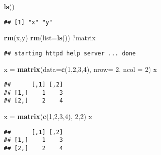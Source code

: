 \documentclass[]{article}
\newenvironment{Shaded}{\begin{snugshade}}{\end{snugshade}}
\newcommand{\KeywordTok}[1]{\textcolor[rgb]{0.13,0.29,0.53}{\textbf{#1}}}
\newcommand{\DataTypeTok}[1]{\textcolor[rgb]{0.13,0.29,0.53}{#1}}
\newcommand{\DecValTok}[1]{\textcolor[rgb]{0.00,0.00,0.81}{#1}}
\newcommand{\StringTok}[1]{\textcolor[rgb]{0.31,0.60,0.02}{#1}}
\newcommand{\NormalTok}[1]{#1}
\begin{document}
\begin{Shaded}
\begin{Highlighting}[]
\KeywordTok{ls}\NormalTok{()}
\end{Highlighting}
\end{Shaded}

\begin{verbatim}
## [1] "x" "y"
\end{verbatim}

\begin{Shaded}
\begin{Highlighting}[]
\KeywordTok{rm}\NormalTok{(x,y)}
\KeywordTok{rm}\NormalTok{(}\DataTypeTok{list=}\KeywordTok{ls}\NormalTok{())}
\NormalTok{?matrix}
\end{Highlighting}
\end{Shaded}

\begin{verbatim}
## starting httpd help server ... done
\end{verbatim}

\begin{Shaded}
\begin{Highlighting}[]
\NormalTok{x =}\StringTok{ }\KeywordTok{matrix}\NormalTok{(}\DataTypeTok{data=}\KeywordTok{c}\NormalTok{(}\DecValTok{1}\NormalTok{,}\DecValTok{2}\NormalTok{,}\DecValTok{3}\NormalTok{,}\DecValTok{4}\NormalTok{), }\DataTypeTok{nrow=} \DecValTok{2}\NormalTok{, }\DataTypeTok{ncol =} \DecValTok{2}\NormalTok{)}
\NormalTok{x}
\end{Highlighting}
\end{Shaded}

\begin{verbatim}
##      [,1] [,2]
## [1,]    1    3
## [2,]    2    4
\end{verbatim}

\begin{Shaded}
\begin{Highlighting}[]
\NormalTok{x =}\StringTok{ }\KeywordTok{matrix}\NormalTok{(}\KeywordTok{c}\NormalTok{(}\DecValTok{1}\NormalTok{,}\DecValTok{2}\NormalTok{,}\DecValTok{3}\NormalTok{,}\DecValTok{4}\NormalTok{), }\DecValTok{2}\NormalTok{,}\DecValTok{2}\NormalTok{)}
\NormalTok{x}
\end{Highlighting}
\end{Shaded}

\begin{verbatim}
##      [,1] [,2]
## [1,]    1    3
## [2,]    2    4
\end{verbatim}
\end{document}
